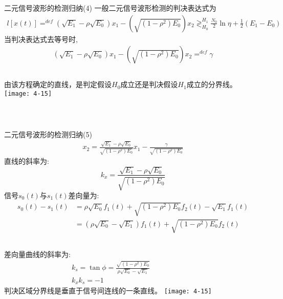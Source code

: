 \begin{frame}[shrink]{二元信号波形的检测归纳(4)}
一般二元信号波形检测的判决表达式为
\begin{align*}
l[x(t)]\mathop{=}^{def}\left(\sqrt{E_1}-\rho\sqrt{E_0}\right)x_1-\left(\sqrt{(1-\rho^2)E_0}\right)x_2\mathop{\gtrless}_{H_0}^{H_1}\frac{N_0}{2}\ln\eta+\frac{1}{2}(E_1-E_0)
\end{align*}
当判决表达式去等号时,
\begin{align*}
\left(\sqrt{E_1}-\rho\sqrt{E_0}\right)x_1-\left(\sqrt{(1-\rho^2)E_0}\right)x_2\mathop{=}^{def}\gamma
\end{align*}
\begin{columns}%
	由该方程确定的直线，是判定假设$H_0$成立还是判决假设$H_1$成立的分界线。
	\texttt{[image: 4-15]}
\end{columns}
~\\
\end{frame}

\begin{frame}[shrink]{二元信号波形的检测归纳(5)}
\begin{align*}
x_2=\frac{\sqrt{E_1}-\rho\sqrt{E_0}}{\sqrt{(1-\rho^2)E_0}}x_1-\frac{\gamma}{\sqrt{(1-\rho^2)E_0}}
\end{align*}
直线的斜率为:
\[k_x=\frac{\sqrt{E_1}-\rho\sqrt{E_0}}{\sqrt{(1-\rho^2)E_0}} \]
信号$s_0(t)$与$s_1(t)$差向量为:
\begin{align*}
s_0(t)-s_1(t)&=\rho\sqrt{E_0}f_1(t)+\sqrt{(1-\rho^2)E_0}f_2(t)-\sqrt{E_1}f_1(t)\\
&=\left(\rho\sqrt{E_0}-\sqrt{E_1}\right)f_1(t)+\sqrt{(1-\rho^2)E_0}f_2(t)
\end{align*}
\begin{columns}%
差向量曲线的斜率为:
\begin{align*}
&k_s=\tan\phi=\frac{\sqrt{(1-\rho^2)E_0}}{\rho\sqrt{E_0}-\sqrt{E_1}}\\
&k_xk_s=-1
\end{align*}
判决区域分界线是垂直于信号间连线的一条直线。
\texttt{[image: 4-15]}
\end{columns}
~\\
\end{frame}

